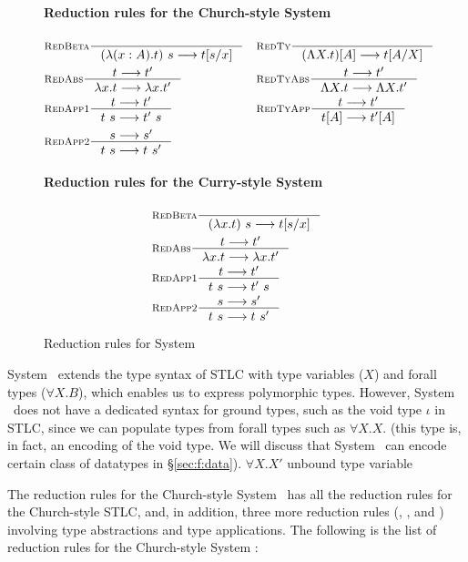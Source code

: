 \begin{figure}
\paragraph{Reduction rules for the Church-style System \F}
\begin{align*}
& \inference[\sc RedBeta]{}{(\l(x:A).t)~s --> t[s/x]}
&&\inference[\sc RedTy]{}{(\L X   .t)[A] --> t[A/X]} \\
& \inference[\sc RedAbs]{t --> t'}{\l x   .t --> \l x   .t'}
&&\inference[\sc RedTyAbs]{t --> t'}{\L X   .t --> \L X   .t'} \\
& \inference[\sc RedApp1]{t --> t'}{t~s --> t'~s}
&&\inference[\sc RedTyApp]{t --> t'}{t[A] --> t'[A]} \\
& \inference[\sc RedApp2]{s --> s'}{t~s --> t~s'}
\end{align*}
\paragraph{Reduction rules for the Curry-style System \F}
\begin{align*}
& \inference[\sc RedBeta]{}{(\l x   .t)~s --> t[s/x]} \\
& \inference[\sc RedAbs]{t --> t'}{\l x   .t --> \l x   .t'} \\
& \inference[\sc RedApp1]{t --> t'}{t~s --> t'~s} \\
& \inference[\sc RedApp2]{s --> s'}{t~s --> t~s'}
\end{align*}
\caption{Reduction rules for System \F}
\label{fig:redf}
\end{figure}

System \F\ extends the type syntax of STLC with type variables ($X$) and
forall types ($\forall X.B$), which enables us to express polymorphic types.
However, System \F\ does not have a dedicated syntax for ground types,
such as the void type $\iota$ in STLC, since we can populate types from
forall types such as $\forall X.X$. (this type is, in fact, an encoding of
the void type. We will discuss that System \F\ can encode certain class of
datatypes in \S\ref{sec:f:data}).
$\forall X.X'$
unbound type variable

The reduction rules for the Church-style System \F\ has all the reduction rules
for the Church-style STLC, and, in addition, three more reduction rules
(, , and ) involving
type abstractions and type applications. The following is the list of
reduction rules for the Church-style System \F:

